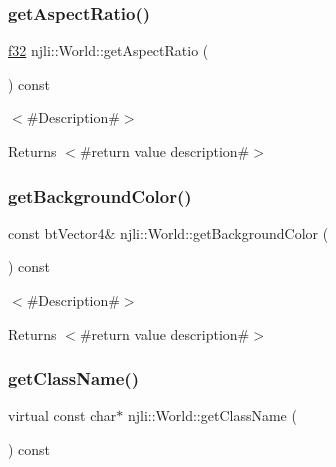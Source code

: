 \mbox{\label{classnjli_1_1_world_a4f3d49c5cc8e3a3a2c2439e663a9c60b}} 
\subsubsection{\texorpdfstring{get\+Aspect\+Ratio()}{getAspectRatio()}}
{\footnotesize\ttfamily \mbox{\hyperlink{_util_8h_a5f6906312a689f27d70e9d086649d3fd}{f32}} njli\+::\+World\+::get\+Aspect\+Ratio (\begin{DoxyParamCaption}{ }\end{DoxyParamCaption}) const}

$<$\#\+Description\#$>$

\begin{DoxyReturn}{Returns}
$<$\#return value description\#$>$ 
\end{DoxyReturn}
\mbox{\label{classnjli_1_1_world_a7805d9b4c5ef0943a5c1c32b507d2151}} 
\subsubsection{\texorpdfstring{get\+Background\+Color()}{getBackgroundColor()}}
{\footnotesize\ttfamily const bt\+Vector4\& njli\+::\+World\+::get\+Background\+Color (\begin{DoxyParamCaption}{ }\end{DoxyParamCaption}) const}

$<$\#\+Description\#$>$

\begin{DoxyReturn}{Returns}
$<$\#return value description\#$>$ 
\end{DoxyReturn}
\mbox{\label{classnjli_1_1_world_a2811263a084944cded212cd714a165cf}} 
\subsubsection{\texorpdfstring{get\+Class\+Name()}{getClassName()}}
{\footnotesize\ttfamily virtual const char$\ast$ njli\+::\+World\+::get\+Class\+Name (\begin{DoxyParamCaption}{ }\end{DoxyParamCaption}) const\hspace{0.3cm}{\ttfamily [virtual]}}

